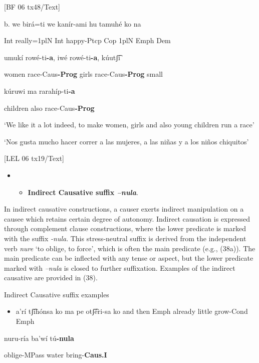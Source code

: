 [BF 06 tx48/Text]

b.   we   birá=ti     we   kanír-ami   hu   tamuhé ko   na

    Int   really=1plN   Int   happy-Ptcp   Cop   1plN    Emph   Dem

umukí     rowé-ti\textbf{{}-a},     iwé   rowé-ti\textbf{{}-a},     kúutʃ͡i 

    women    race-Caus\textbf{{}-Prog}  girls  race-Caus\textbf{{}-Prog}  small

kúruwi     ma   rarahíp-ti\textbf{{}-a}  

    children  also  race-Caus\textbf{{}-Prog}

‘We like it a lot indeed, to make women, girls and also young children     run a race’

‘Nos gusta mucho hacer correr a las mujeres, a las niñas y a los niños chiquitos’            

[LEL 06 tx19/Text]

\begin{itemize}
\item \begin{itemize}
\item \textbf{Indirect Causative suffix \textit{–nula}}.
\end{itemize}
\end{itemize}

In indirect causative constructions, a causer exerts indirect manipulation on a causee which retains certain degree of autonomy. Indirect causation is expressed through complement clause constructions, where the lower predicate is marked with the suffix      \textit{{}-nula}. This stress-neutral suffix is derived from the independent verb \textit{nure} ‘to oblige, to force’, which is often the main predicate (e.g., (38a)). The main predicate can be inflected with any tense or aspect, but the lower predicate marked with \textit{–nula} is closed to further suffixation. Examples of the indirect causative are provided in (38).

   Indirect Causative suffix examples

\begin{itemize}
\item    a’rí   tʃ͡ihónsa   ko        ma    pe   otʃ͡éri-sa  ko   and  then    Emph  already    little  grow-Cond  Emph
\end{itemize}

nuru-ría  ba’wí   tú\textbf{{}-nula}      

oblige-MPass  water  bring-\textbf{Caus.I}

